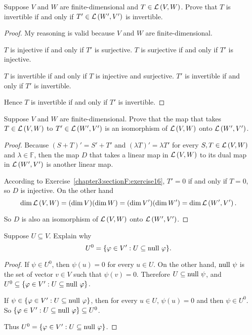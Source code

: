 \begin{exercise}
    Suppose $V$ and $W$ are finite-dimensional and $T \in \mathcal{L}\left({V, W}\right)$. Prove that $T$ is invertible if and only if $T' \in \mathcal{L}\left({W', V'}\right)$ is invertible.
\end{exercise}

\begin{proof}
    My reasoning is valid because $V$ and $W$ are finite-dimensional.

    $T$ is injective if and only if $T'$ is surjective. $T$ is surjective if and only if $T'$ is injective.

    $T$ is invertible if and only if $T$ is injective and surjective. $T'$ is invertible if and only if $T'$ is invertible.

    Hence $T$ is invertible if and only if $T'$ is invertible.
\end{proof}
\newpage

\begin{exercise}
    Suppose $V$ and $W$ are finite-dimensional. Prove that the map that takes $T\in \mathcal{L}\left({V, W}\right)$ to $T'\in \mathcal{L}\left({W', V'}\right)$ is an isomorphism of $\mathcal{L}\left({V, W}\right)$ onto $\mathcal{L}\left({W', V'}\right)$.
\end{exercise}

\begin{proof}
    Because ${(S + T)}' = S' + T'$ and ${(\lambda T)}' = \lambda T'$ for every $S, T\in \mathcal{L}\left({V, W}\right)$ and $\lambda\in\mathbb{F}$, then the map $D$ that takes a linear map in $\mathcal{L}\left({V, W}\right)$ to its dual map in $\mathcal{L}\left({W', V'}\right)$ is another linear map.

    According to Exercise~\ref{chapter3:sectionF:exercise16}, $T' = 0$ if and only if $T = 0$, so $D$ is injective. On the other hand
    \[
        \dim\mathcal{L}\left({V, W}\right) = (\dim V)(\dim W) = (\dim V')(\dim W') = \dim\mathcal{L}\left({W', V'}\right).
    \]

    So $D$ is also an isomorphism of $\mathcal{L}\left({V, W}\right)$ onto $\mathcal{L}\left({W', V'}\right)$.
\end{proof}
\newpage

\begin{exercise}\label{chapter3:sectionF:exercise19}
    Suppose $U \subseteq V$. Explain why
    \[
        U^{0} = \{ \varphi\in V': U\subseteq \operatorname{null}\,{\varphi} \}.
    \]
\end{exercise}

\begin{proof}
    If $\psi\in U^{0}$, then $\psi(u) = 0$ for every $u\in U$. On the other hand, $\operatorname{null}\,{\psi}$ is the set of vector $v\in V$ such that $\psi(v) = 0$. Therefore $U\subseteq \operatorname{null}\,{\psi}$, and $U^{0}\subseteq \{ \varphi\in V': U\subseteq \operatorname{null}\,{\varphi} \}$.

    If $\psi\in \{ \varphi\in V': U\subseteq \operatorname{null}\,{\varphi} \}$, then for every $u\in U$, $\psi(u) = 0$ and then $\psi\in U^{0}$. So $\{ \varphi\in V': U\subseteq \operatorname{null}\,{\varphi} \}\subseteq U^{0}$.

    Thus $U^{0} = \{ \varphi\in V': U\subseteq \operatorname{null}\,{\varphi} \}$.
\end{proof}
\newpage


